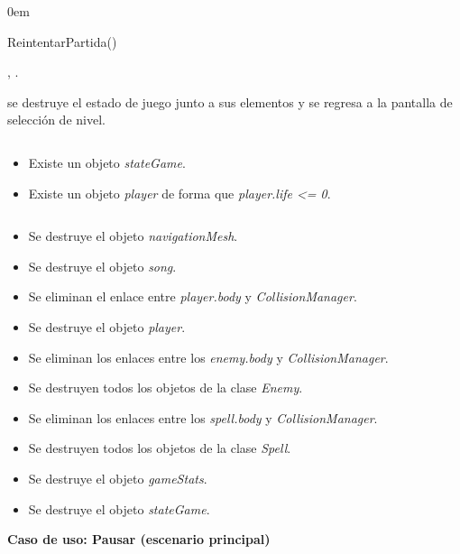 \begin{description}
    \itemsep0em
    \item [Operación] ReintentarPartida()
    \item [Actores] \jugador, \sistema.
    \item [Responsabilidades] se destruye el estado de juego junto a sus
    elementos y se regresa a la pantalla de selección de nivel.
    \item [Precondiciones]$\quad$
        \begin{itemize}
            \itemsep0em
            \item Existe un objeto \textit{stateGame}.
            \item Existe un objeto \textit{player} de forma que
            \textit{player.life <= 0}.
        \end{itemize}
    \item [Postcondiciones]$\quad$
        \begin{itemize}
            \itemsep0em
            \item Se destruye el objeto \textit{navigationMesh}.
            \item Se destruye el objeto \textit{song}.
            \item Se eliminan el enlace entre \textit{player.body} y \textit{CollisionManager}.
            \item Se destruye el objeto \textit{player}.
            \item Se eliminan los enlaces entre los \textit{enemy.body}
            y \textit{CollisionManager}.
            \item Se destruyen todos los objetos de la clase \textit{Enemy}.
            \item Se eliminan los enlaces entre los \textit{spell.body} y
            \textit{CollisionManager}.
            \item Se destruyen todos los objetos de la clase \textit{Spell}.
            \item Se destruye el objeto \textit{gameStats}.
            \item Se destruye el objeto \textit{stateGame}.\\
        \end{itemize}
\end{description}


\textbf{Caso de uso: Pausar (escenario principal)}


